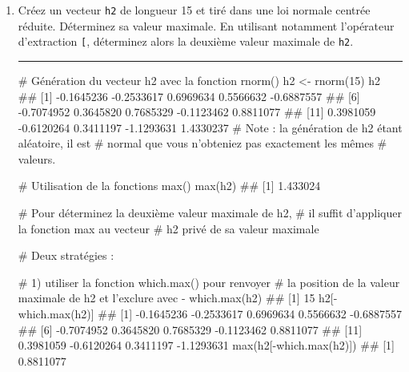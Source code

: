 \documentclass[12pt,twosided, notitlepage]{book}
\newenvironment{Shaded}{}{}
\newcommand{\KeywordTok}[1]{\textcolor[rgb]{0.00,0.00,1.00}{#1}}
\newcommand{\DecValTok}[1]{#1}
\newcommand{\StringTok}[1]{\textcolor[rgb]{0.00,0.50,0.50}{#1}}
\newcommand{\CommentTok}[1]{\textcolor[rgb]{0.00,0.50,0.00}{#1}}
\newcommand{\OperatorTok}[1]{#1}
\newcommand{\NormalTok}[1]{#1}
\newif \ifsol
\renewenvironment{Shaded}{\begin{snugshade}}{\end{snugshade}}
\begin{document}
\begin{enumerate}
  \begin{center} \rule{0.5\linewidth}{\linethickness}\end{center}

  \bigskip  \fi 
\item
  Créez un vecteur \texttt{h2} de longueur 15 et tiré dans une loi
  normale centrée réduite. Déterminez sa valeur
  maximale. En utilisant
  notamment l'opérateur d'extraction \texttt{{[}}, déterminez alors la
  deuxième valeur maximale de \texttt{h2}.

  \ifsol 

  \begin{center} \rule{0.5\linewidth}{\linethickness}\end{center}

\begin{Shaded}
\begin{Highlighting}[]
\CommentTok{# Génération du vecteur h2 avec la fonction rnorm()}
\NormalTok{h2 <-}\StringTok{ }\KeywordTok{rnorm}\NormalTok{(}\DecValTok{15}\NormalTok{)}
\NormalTok{h2}
\NormalTok{  ##  [1] -0.1645236 -0.2533617  0.6969634  0.5566632 -0.6887557}
\NormalTok{  ##  [6] -0.7074952  0.3645820  0.7685329 -0.1123462  0.8811077}
\NormalTok{  ## [11]  0.3981059 -0.6120264  0.3411197 -1.1293631  1.4330237}
\CommentTok{# Note : la génération de h2 étant aléatoire, il est}
\CommentTok{# normal que vous n'obteniez pas exactement les mêmes}
\CommentTok{# valeurs. }

\CommentTok{# Utilisation de la fonctions max()}
\KeywordTok{max}\NormalTok{(h2)}
\NormalTok{  ## [1] 1.433024}

\CommentTok{# Pour déterminez la deuxième valeur maximale de h2,}
\CommentTok{# il suffit d'appliquer la fonction max au vecteur}
\CommentTok{# h2 privé de sa valeur maximale}

\CommentTok{# Deux stratégies : }

\CommentTok{# 1) utiliser la fonction which.max() pour renvoyer }
\CommentTok{# la position de la valeur maximale de h2 et l'exclure avec -}
\KeywordTok{which.max}\NormalTok{(h2)}
\NormalTok{  ## [1] 15}
\NormalTok{h2[}\OperatorTok{-}\KeywordTok{which.max}\NormalTok{(h2)]}
\NormalTok{  ##  [1] -0.1645236 -0.2533617  0.6969634  0.5566632 -0.6887557}
\NormalTok{  ##  [6] -0.7074952  0.3645820  0.7685329 -0.1123462  0.8811077}
\NormalTok{  ## [11]  0.3981059 -0.6120264  0.3411197 -1.1293631}
\KeywordTok{max}\NormalTok{(h2[}\OperatorTok{-}\KeywordTok{which.max}\NormalTok{(h2)])}
\NormalTok{  ## [1] 0.8811077}


\end{Highlighting}
\end{Shaded}
\end{enumerate}
\end{document}

